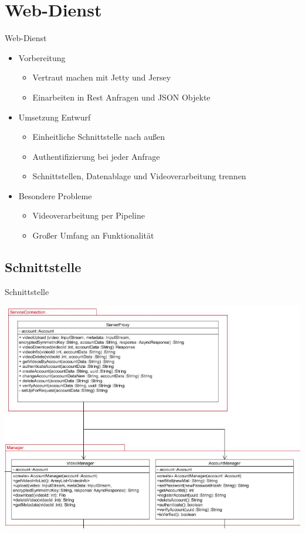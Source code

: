 \documentclass[19pt]{beamer}
\begin{document}
\section{Web-Dienst}
\begin{frame}{Web-Dienst}
	\begin{itemize}
		\item Vorbereitung
		\begin{itemize}
			\item Vertraut machen mit Jetty und Jersey
			\pause
			\item Einarbeiten in Rest Anfragen und JSON Objekte
			\pause
		\end{itemize}
		\item Umsetzung Entwurf
		\begin{itemize}
			\item Einheitliche Schnittstelle nach außen
			\pause
			\item Authentifizierung bei jeder Anfrage
			\pause
			\item Schnittstellen, Datenablage und Videoverarbeitung trennen
			\pause
		\end{itemize}
		\item Besondere Probleme
		\begin{itemize}
			\item Videoverarbeitung per Pipeline
			\pause
			\item Großer Umfang an Funktionalität
		\end{itemize}
	\end{itemize}
\end{frame}
\subsection{Schnittstelle}
\begin{frame}{Schnittstelle}
\begin{center}
\includegraphics[scale=0.3]{resources/service_rest.png}
\end{center}
\end{frame}
\end{document}

